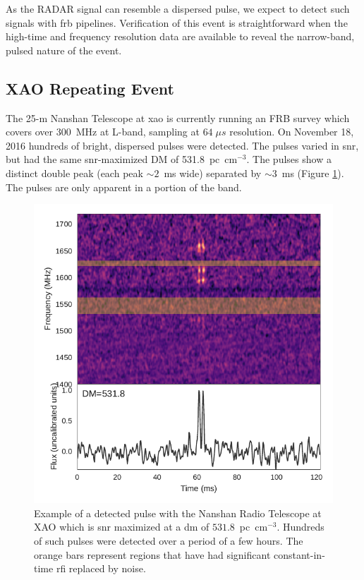 \documentclass[a4paper,fleqn,usenatbib]{mnras}
\begin{document}
As the RADAR signal can resemble a dispersed pulse, we expect to detect such
signals with \gls{frb} pipelines.  Verification of this event is straightforward
when the high-time and frequency resolution data are available to reveal the
narrow-band, pulsed nature of the event.

\subsection{XAO Repeating Event}
\label{sec:xao_event}

The 25-m Nanshan Telescope at \gls{xao} is currently running an FRB survey which
covers over 300~MHz at L-band, sampling at $64 \; \mu s$ resolution. On November
18, 2016 hundreds of bright, dispersed pulses were detected. The pulses varied
in \gls{snr}, but had the same \gls{snr}-maximized DM of 531.8~pc~cm$^{-3}$. The
pulses show a distinct double peak (each peak $\sim 2$~ms wide) separated by
$\sim 3$~ms (Figure \ref{fig:xao_dynamic}). The pulses are only apparent in a
portion of the band.

\begin{figure}
    \includegraphics[width=1.0\linewidth]{figures/XAO_pulse_dynamic.pdf}
    \caption{Example of a detected pulse with the Nanshan Radio Telescope at XAO
    which is \gls{snr} maximized at a \gls{dm} of $531.8$~pc~cm$^{-3}$.
    Hundreds of such pulses were detected over a period of a few hours. The
    orange bars represent regions that have had significant constant-in-time
    \gls{rfi} replaced by noise.
    }
    \label{fig:xao_dynamic}
\end{figure}
\end{document}
